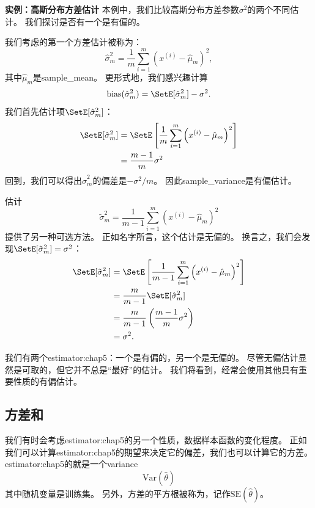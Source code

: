 
\textbf{实例：高斯分布方差估计}\quad 
本例中，我们比较高斯分布方差参数$\sigma^2$的两个不同估计。
我们探讨是否有一个是有偏的。

我们考虑的第一个方差估计被称为：
\begin{equation}
    \hat{\sigma}_m^2 = \frac{1}{m} \sum_{i=1}^m \left( x^{(i)} - \hat{\mu}_m \right)^2,
\end{equation}
其中$\hat{\mu}_m$是\gls{sample_mean}。
更形式地，我们感兴趣计算
\begin{equation}
\label{eq:5.37}
    \text{bias} (\hat{\sigma}_m^2) = \SetE [ \hat{\sigma}_m^2 ]  - \sigma^2.
\end{equation}
我们首先估计项$\SetE [ \hat{\sigma}_m^2 ]$：
\begin{align}
    \SetE [ \hat{\sigma}_m^2 ]  &= \SetE \left[ \frac{1}{m} \sum_{i=1}^m \left( x^{(i)} - \hat{\mu}_m \right)^2  \right] \\
    &= \frac{m-1}{m} \sigma^2
\end{align}
回到，我们可以得出$\hat{\sigma}^2_m$的偏差是$-\sigma^2/m$。
因此\gls{sample_variance}是有偏估计。

估计
\begin{equation}
    \tilde{\sigma}_m^2 = \frac{1}{m-1} \sum_{i=1}^m \left( x^{(i)} - \hat{\mu}_m \right)^2
\end{equation}
提供了另一种可选方法。
正如名字所言，这个估计是无偏的。
换言之，我们会发现$\SetE[\tilde{\sigma}_m^2] = \sigma^2$：
\begin{align}
    \SetE[\tilde{\sigma}_m^2] &= \SetE \left[ \frac{1}{m-1} \sum_{i=1}^m \left( x^{(i)} - \hat{\mu}_m \right)^2 \right] \\
        &= \frac{m}{m-1} \SetE[ \hat{\sigma}_m^2 ]  \\
        &= \frac{m}{m-1} \left( \frac{m-1}{m} \sigma^2 \right) \\
        &= \sigma^2.
\end{align}


我们有两个\gls{estimator:chap5}：一个是有偏的，另一个是无偏的。
尽管无偏估计显然是可取的，但它并不总是``最好''的估计。
我们将看到，经常会使用其他具有重要性质的有偏估计。

\subsection{方差和}
\label{sec:variance_and_standard_error}
我们有时会考虑\gls{estimator:chap5}的另一个性质，数据样本函数的变化程度。
正如我们可以计算\gls{estimator:chap5}的期望来决定它的偏差，我们也可以计算它的方差。
\gls{estimator:chap5}的就是一个\gls{variance}
\begin{equation}
    \text{Var}(\hat{\theta})
\end{equation}
其中随机变量是训练集。
另外，方差的平方根被称为，记作$\text{SE}(\hat{\theta})$。

